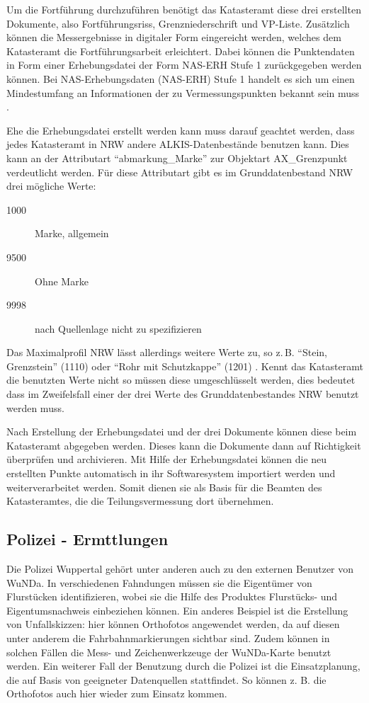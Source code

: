 Um die Fortführung durchzuführen benötigt das Katasteramt diese drei erstellten Dokumente, also Fortführungsriss, Grenzniederschrift und \ac{VP-Liste}.
Zusätzlich können die Messergebnisse in digitaler Form eingereicht werden, welches dem Katasteramt die Fortführungsarbeit erleichtert. Dabei können die Punktendaten in Form einer Erhebungsdatei der Form NAS-ERH Stufe 1 zurückgegeben werden können.
Bei NAS-Erhebungsdaten (NAS-ERH) Stufe 1 handelt es sich um einen Mindestumfang an Informationen der zu Vermessungspunkten bekannt sein muss \autocite[vgl.][]{bezk-nas-erh}.

Ehe die Erhebungsdatei erstellt werden kann muss darauf geachtet werden, dass jedes Katasteramt in \ac{NRW} andere ALKIS-Datenbestände benutzen kann. Dies kann an der Attributart "`abmarkung\_Marke"' zur Objektart AX\_Grenzpunkt verdeutlicht werden. Für diese Attributart gibt es im  Grunddatenbestand NRW drei mögliche Werte:
\begin{description}
\item[1000] Marke, allgemein
\item[9500] Ohne Marke
\item[9998] nach Quellenlage nicht zu spezifizieren 
\end{description}
Das Maximalprofil NRW lässt allerdings weitere Werte zu, so z.\,B. "`Stein, Grenzstein"' (1110) oder "`Rohr mit Schutzkappe"' (1201) \autocite[vgl.][]{bezk-schluessel}. Kennt das Katasteramt die benutzten Werte nicht so müssen diese umgeschlüsselt werden, dies bedeutet dass im Zweifelsfall einer der drei Werte des Grunddatenbestandes NRW benutzt werden muss. 

Nach Erstellung der Erhebungsdatei und der drei Dokumente können diese beim Katasteramt abgegeben werden. Dieses kann die Dokumente dann auf Richtigkeit überprüfen und archivieren.
Mit Hilfe der Erhebungsdatei können die neu erstellten Punkte automatisch in ihr Softwaresystem importiert werden und weiterverarbeitet werden.
Somit dienen sie als Basis für die Beamten des Katasteramtes, die die Teilungsvermessung dort übernehmen.

\subsection{Polizei - Ermttlungen} \label{subsec:polizei_ermittlung}
Die Polizei Wuppertal gehört unter anderen auch zu den externen Benutzer von \ac{WuNDa}.
In verschiedenen Fahndungen müssen sie die Eigentümer von Flurstücken identifizieren, wobei sie die Hilfe des Produktes Flurstücks- und Eigentumsnachweis einbeziehen können.
Ein anderes Beispiel ist die Erstellung von Unfallskizzen: hier können Orthofotos angewendet werden, da auf diesen unter anderem die Fahrbahnmarkierungen sichtbar sind. Zudem können in solchen Fällen die Mess- und Zeichenwerkzeuge der \ac{WuNDa}-Karte benutzt werden. Ein weiterer Fall der Benutzung durch die Polizei ist die Einsatzplanung, die auf Basis von geeigneter Datenquellen stattfindet. So können z. B. die Orthofotos auch hier wieder zum Einsatz kommen.

